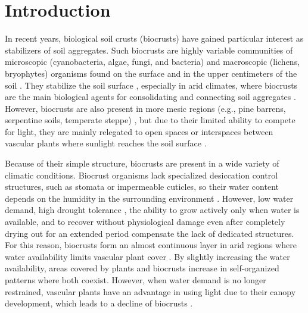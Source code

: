 \section{Introduction}
In recent years, biological soil crusts (biocrusts) have gained particular interest as stabilizers of soil aggregates. Such biocrusts are highly variable communities of microscopic (cyanobacteria, algae, fungi, and bacteria) and macroscopic (lichens, bryophytes) organisms found on the surface and in the upper centimeters of the soil \citep{Gao2017}. They stabilize the soil surface \citep{GarciaPichel2016}, especially in arid climates, where biocrusts are the main biological agents for consolidating and connecting soil aggregates \citep{BelnapBudel2016}. However, biocrusts are also present in more mesic regions (e.g., pine barrens, serpentine soils, temperate steppe) \citep{Belnap2016}, but due to their limited ability to compete for light, they are mainly relegated to open spaces or interspaces between vascular plants where sunlight reaches the soil surface \citep{Issa1999}.

Because of their simple structure, biocrusts are present in a wide variety of climatic conditions. Biocrust organisms lack specialized desiccation control structures, such as stomata or impermeable cuticles, so their water content depends on the humidity in the surrounding environment \citep{Thielen2021}. However, low water demand, high drought tolerance \citep{Chen2020}, the ability to grow actively only when water is available, and to recover without physiological damage even after completely drying out for an extended period \citep{Oliver2005} compensate the lack of dedicated structures. For this reason, biocrusts form an almost continuous layer in arid regions where water availability limits vascular plant cover \citep{Grote2010}\citep{Colesie2014}. By slightly increasing the water availability, areas covered by plants and biocrusts increase in self-organized patterns where both coexist. However, when water demand is no longer restrained, vascular plants have an advantage in using light due to their canopy development, which leads to a decline of biocrusts \citep{Chen2018}.

